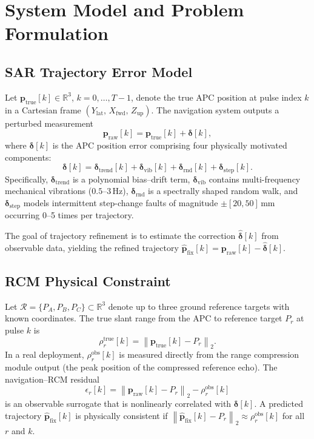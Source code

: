 \documentclass[conference]{IEEEtran}
\newcommand{\vp}{\mathbf{p}}
\newcommand{\vdelta}{\bm{\delta}}
\newcommand{\norm}[1]{\left\lVert#1\right\rVert}
\begin{document}
\section{System Model and Problem Formulation}
\label{sec:system}

\subsection{SAR Trajectory Error Model}

Let $\vp_{\text{true}}[k] \in \mathbb{R}^{3}$, $k = 0,\ldots,T{-}1$,
denote the true APC position at pulse index $k$ in a Cartesian frame
$(Y_\text{lat},\, X_\text{fwd},\, Z_\text{up})$.
The navigation system outputs a perturbed measurement
\begin{equation}
  \vp_{\text{raw}}[k] = \vp_{\text{true}}[k] + \vdelta[k],
  \label{eq:error_model}
\end{equation}
where $\vdelta[k]$ is the APC position error comprising four
physically motivated components:
\begin{equation}
  \vdelta[k] = \vdelta_\text{trend}[k] + \vdelta_\text{vib}[k]
               + \vdelta_\text{rnd}[k]  + \vdelta_\text{step}[k].
  \label{eq:error_decomp}
\end{equation}
Specifically, $\vdelta_\text{trend}$ is a polynomial bias–drift term,
$\vdelta_\text{vib}$ contains multi-frequency mechanical vibrations
($0.5$–$3$\,Hz),
$\vdelta_\text{rnd}$ is a spectrally shaped random walk,
and $\vdelta_\text{step}$ models intermittent step-change faults
of magnitude $\pm[20, 50]$\,mm occurring 0–5 times per trajectory.

The goal of trajectory refinement is to estimate the correction
$\hat{\vdelta}[k]$ from observable data, yielding the refined trajectory
$\hat{\vp}_{\text{fix}}[k] = \vp_{\text{raw}}[k] - \hat{\vdelta}[k]$.

\subsection{RCM Physical Constraint}

Let $\mathcal{R} = \{P_A, P_B, P_C\} \subset \mathbb{R}^{3}$
denote up to three ground reference targets with known coordinates.
The true slant range from the APC to reference target $P_r$ at pulse $k$ is
\begin{equation}
  \rho_r^{\text{true}}[k] = \norm{\vp_{\text{true}}[k] - P_r}_2.
  \label{eq:true_rcm}
\end{equation}
In a real deployment, $\rho_r^{\text{obs}}[k]$ is measured directly from
the range compression module output (the peak position of the compressed
reference echo).
The navigation–RCM residual
\begin{equation}
  \epsilon_r[k] = \norm{\vp_{\text{raw}}[k] - P_r}_2 - \rho_r^{\text{obs}}[k]
  \label{eq:residual}
\end{equation}
is an observable surrogate that is nonlinearly correlated with $\vdelta[k]$.
A predicted trajectory $\hat{\vp}_{\text{fix}}[k]$ is physically consistent
if $\norm{\hat{\vp}_{\text{fix}}[k] - P_r}_2 \approx \rho_r^{\text{obs}}[k]$
for all $r$ and $k$.
\end{document}
